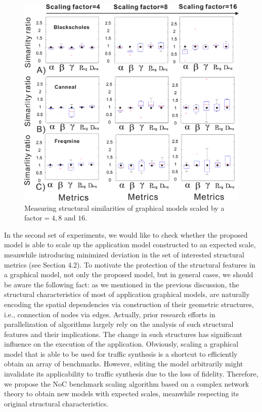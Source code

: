 \begin{figure}[tb]
  \centering
  \includegraphics[width=0.8\columnwidth]{str_2.eps}
  \vskip -2mm
  \caption{Measuring structural similarities of graphical models scaled by a factor$= 4,8$ and $16$.}
  \label{fig:stru_sim}
  \vskip -7.5mm
\end{figure}
\indent In the second set of experiments, we would like to check whether the proposed model is able to scale up the application model constructed to an expected scale, meanwhile introducing minimized deviation in the set of interested structural metrics (see Section 4.2). To motivate the  protection of the structural features in a graphical model, not only the proposed model, but in general cases, we should be aware the following fact:  as we mentioned in the previous discussion, the structural characteristics of most of application graphical models, are naturally encoding the spatial dependencies via construction of their geometric structures, i.e., connection of nodes via edges. Actually, prior research efforts in parallelization of algorithms largely rely on the analysis of such structural features and their implications. The change in such structures has significant influence on the execution of the application. Obviously, scaling a graphical model that is able to be used for traffic synthesis is a shortcut to efficiently obtain an array of benchmarks. However, editing the model  arbitrarily might invalidate its applicability to traffic synthesis due to the loss of fidelity. Therefore, we propose the NoC benchmark scaling algorithm based on a complex network theory to obtain new models with expected scales, meanwhile respecting its original structural characteristics. \\
